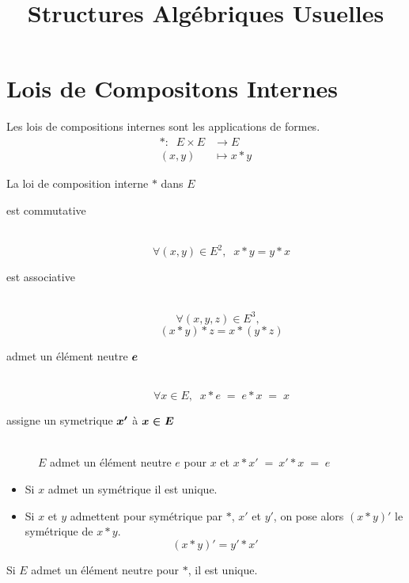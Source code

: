 

\title{Structures Algébriques Usuelles}



\tableofcontents

\section{Lois de Compositons Internes}

\begin{dfn}
Les lois de compositions internes sont les applications de formes.
\begin{align*}
    * : \;\;    E \times E &\to E \\
                (x, y) &\mapsto x * y
\end{align*}
\end{dfn}

\begin{dfn}
La loi de composition interne $*$ dans $E$
\begin{description}
    \item[est commutative] \quad \\
    \[\forall (x, y) \in E^2, \;\; x * y = y * x\]
    \item[est associative] \quad \\
    \[\forall (x, y, z) \in E^3, \;\;\]
    \[(x * y) * z = x * (y * z)\]
    \item[admet un élément neutre $\boldsymbol{e}$] \quad \\
    \[\forall x \in E,\;\; x * e \;=\; e * x \;=\; x\]
    \item[assigne un symetrique $\boldsymbol{x'}$ à $\boldsymbol{x \in E}$] \quad \\
    $E$ admet un élément neutre $e$ pour $x$
    et $x * x' \;=\: x' * x \;=\; e$
\end{description}
\end{dfn}

\begin{prp}
\begin{itemize}
    \item Si $x$ admet un symétrique il est unique.
    \item Si $x$ et $y$ admettent pour symétrique par $*$,
    $x'$ et $y'$, on pose alors $(x * y)'$ le symétrique de $x * y$.
    \[
        (x * y)' = y' * x'
    \]
\end{itemize}
\end{prp}

\begin{prp}
Si $E$ admet un élément neutre pour $*$, il est unique.
\end{prp}

